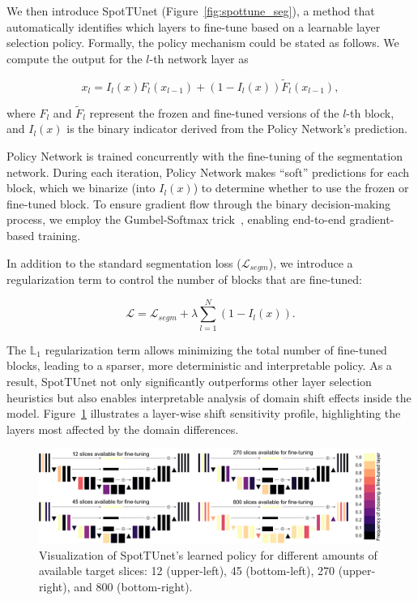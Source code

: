 We then introduce SpotTUnet (Figure~\ref{fig:spottune_seg}), a method that automatically identifies which layers to fine-tune based on a learnable layer selection policy. Formally, the policy mechanism could be stated as follows. We compute the output for the $l$-th network layer as


\begin{equation}
	x_l = I_l ( x ) F_l ( x_{l-1} ) + (1 - I_l ( x )) \tilde{F}_l ( x_{l-1} ),
\end{equation}

\noindent
where $F_l$ and $\tilde{F}_l$ represent the frozen and fine-tuned versions of the $l$-th block, and $I_l(x)$ is the binary indicator derived from the Policy Network’s prediction.

Policy Network is trained concurrently with the fine-tuning of the segmentation network. During each iteration, Policy Network makes ``soft'' predictions for each block, which we binarize (into $I_l(x)$) to determine whether to use the frozen or fine-tuned block. To ensure gradient flow through the binary decision-making process, we employ the Gumbel-Softmax trick~\cite{guo2019spottune}, enabling end-to-end gradient-based training.

In addition to the standard segmentation loss ($\mathcal{L}_{segm}$), we introduce a regularization term to control the number of blocks that are fine-tuned:

\begin{equation}
	\mathcal{L} = \mathcal{L}_{segm} + \lambda \sum_{l=1}^N \left( 1 - I_l (x) \right).
\end{equation}

The $\mathbb{L}_1$ regularization term allows minimizing the total number of fine-tuned blocks, leading to a sparser, more deterministic and interpretable policy. As a result, SpotTUnet not only significantly outperforms other layer selection heuristics but also enables interpretable analysis of domain shift effects inside the model. Figure~\ref{fig:layerswise_template} illustrates a layer-wise shift sensitivity profile, highlighting the layers most affected by the domain differences.

\begin{figure}[h!]
	\centering
	\includegraphics[width=\textwidth]{Dissertation/Figures/2_mri/layerwise_template.pdf}
	\caption{Visualization of SpotTUnet's learned policy for different amounts of available target slices: 12 (upper-left), 45 (bottom-left), 270 (upper-right), and 800 (bottom-right).}
	\label{fig:layerswise_template}
\end{figure}

